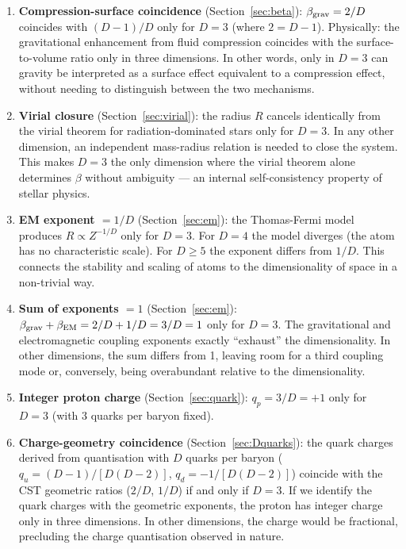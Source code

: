\documentclass[10pt,a4paper]{article}
\begin{document}
\begin{enumerate}
\item \textbf{Compression-surface coincidence} (Section~\ref{sec:beta}): $\beta_{\rm grav} = 2/D$ coincides with $(D-1)/D$ only for $D = 3$ (where $2 = D-1$). Physically: the gravitational enhancement from fluid compression coincides with the surface-to-volume ratio only in three dimensions. In other words, only in $D = 3$ can gravity be interpreted as a surface effect equivalent to a compression effect, without needing to distinguish between the two mechanisms.

\item \textbf{Virial closure} (Section~\ref{sec:virial}): the radius $R$ cancels identically from the virial theorem for radiation-dominated stars only for $D = 3$. In any other dimension, an independent mass-radius relation is needed to close the system. This makes $D = 3$ the only dimension where the virial theorem alone determines $\beta$ without ambiguity --- an internal self-consistency property of stellar physics.

\item \textbf{EM exponent $= 1/D$} (Section~\ref{sec:em}): the Thomas-Fermi model produces $R \propto Z^{-1/D}$ only for $D = 3$. For $D = 4$ the model diverges (the atom has no characteristic scale). For $D \geq 5$ the exponent differs from $1/D$. This connects the stability and scaling of atoms to the dimensionality of space in a non-trivial way.

\item \textbf{Sum of exponents $= 1$} (Section~\ref{sec:em}): $\beta_{\rm grav} + \beta_{\rm EM} = 2/D + 1/D = 3/D = 1$ only for $D = 3$. The gravitational and electromagnetic coupling exponents exactly ``exhaust'' the dimensionality. In other dimensions, the sum differs from 1, leaving room for a third coupling mode or, conversely, being overabundant relative to the dimensionality.

\item \textbf{Integer proton charge} (Section~\ref{sec:quark}): $q_p = 3/D = +1$ only for $D = 3$ (with 3 quarks per baryon fixed).

\item \textbf{Charge-geometry coincidence} (Section~\ref{sec:Dquarks}): the quark charges derived from quantisation with $D$ quarks per baryon ($q_u = (D-1)/[D(D-2)]$, $q_d = -1/[D(D-2)]$) coincide with the CST geometric ratios ($2/D$, $1/D$) if and only if $D = 3$. If we identify the quark charges with the geometric exponents, the proton has integer charge only in three dimensions. In other dimensions, the charge would be fractional, precluding the charge quantisation observed in nature.
\end{enumerate}
\end{document}
